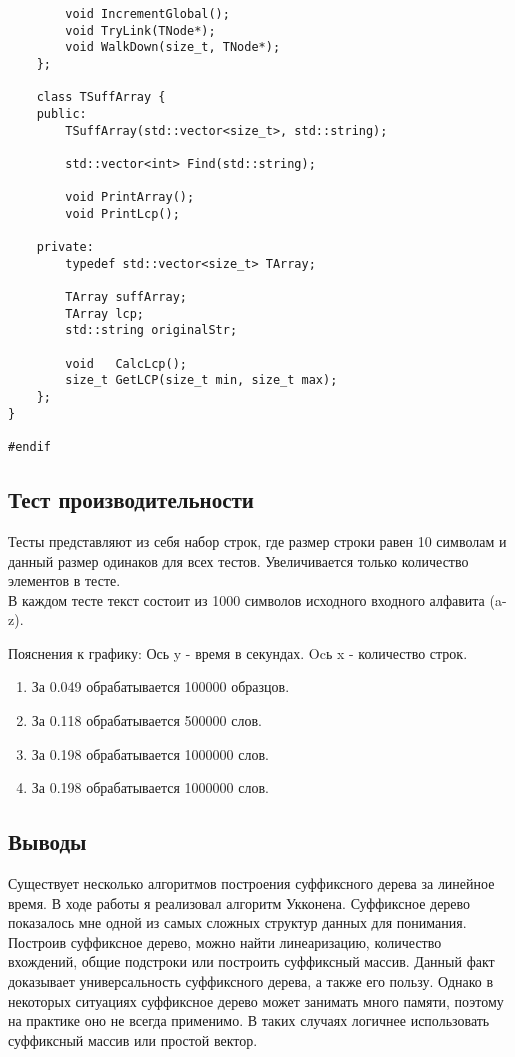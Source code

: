 \documentclass[12pt]{article}
\begin{document}
\begin{verbatim}
        void IncrementGlobal();
        void TryLink(TNode*);
        void WalkDown(size_t, TNode*);
    };

    class TSuffArray {
    public:
        TSuffArray(std::vector<size_t>, std::string);
        
        std::vector<int> Find(std::string);

        void PrintArray();
        void PrintLcp();

    private:
        typedef std::vector<size_t> TArray;

        TArray suffArray;
        TArray lcp;
        std::string originalStr;
        
        void   CalcLcp();
        size_t GetLCP(size_t min, size_t max);
    };
}

#endif
\end{verbatim}

\subsection*{Тест производительности}

Тесты представляют из себя набор строк, где размер строки равен 10 символам и данный размер одинаков для всех тестов. Увеличивается только количество элементов в тесте.\\
В каждом тесте текст состоит из 1000 символов исходного входного алфавита (a-z).

\newline
Пояснения к графику:
Ось y - время в секундах. Ocь x - количество строк.
\begin{enumerate}
\item За 0.049 обрабатывается 100000 образцов.
\item За 0.118 обрабатывается 500000 слов.
\item За 0.198 обрабатывается 1000000 слов.
\item За 0.198 обрабатывается 1000000 слов.
\end{enumerate}

\subsection*{Выводы}

Существует несколько алгоритмов построения суффиксного дерева за линейное время. В ходе работы я реализовал алгоритм Укконена. Суффиксное дерево показалось мне одной из самых сложных структур данных для понимания. Построив суффиксное дерево, можно найти линеаризацию, количество вхождений, общие подстроки или построить суффиксный массив. Данный факт доказывает универсальность суффиксного дерева, а также его пользу. Однако в некоторых ситуациях суффиксное дерево может занимать много памяти, поэтому на практике оно не всегда применимо. В таких случаях логичнее использовать суффиксный массив или простой вектор.
\end{document}
